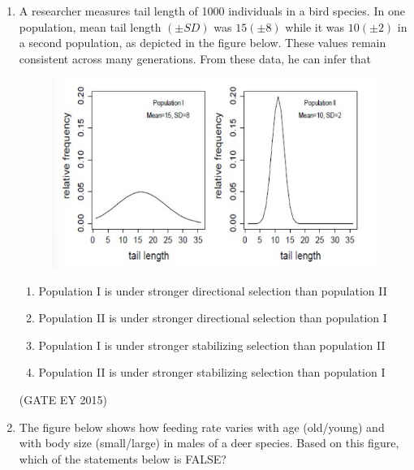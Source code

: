 \documentclass[journal,12pt,onecolumn]{IEEEtran}
\theoremstyle{remark}
\begin{document}
\begin{enumerate}
\item A researcher measures tail length of 1000 individuals in a bird species. In one population, mean tail length $(\pm SD)$ was $15 (\pm 8)$ while it was $10 (\pm 2)$ in a second population, as depicted in the figure below. These values remain consistent across many generations. From these data, he can infer that

\begin{figure}[H]
    \centering
    \includegraphics[]{figs/Q.41.png}
    \caption{}
    \label{fig:6}
\end{figure}

\begin{enumerate}
    
\item Population I is under stronger directional selection than population II
\item Population II is under stronger directional selection than population I
\item Population I is under stronger stabilizing selection than population II
\item   Population II is under stronger stabilizing selection than population I

    \end{enumerate}
    
\hfill{(GATE EY 2015)}


\item 
The figure below shows how feeding rate varies with age (old/young) and with body size (small/large) in males of a deer species. Based on this figure, which of the statements below is FALSE?


\end{enumerate}
\end{document}
